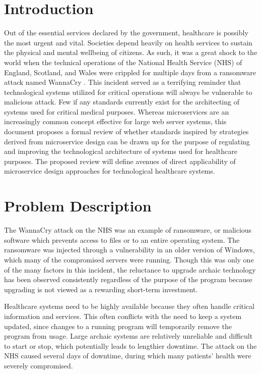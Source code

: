 \documentclass[10pt, oneside, letterpaper]{article}
\begin{document}
	\begin{multicols}{2}

	\section{Introduction}

	Out of the essential services declared by the government, healthcare is possibly the most urgent and vital. Societies depend heavily on health services to sustain the physical and mental wellbeing of citizens. As such, it was a great shock to the world when the technical operations of the National Health Service (NHS) of England, Scotland, and Wales were crippled for multiple days from a ransomware attack named WannaCry \cite{NHS2017}. This incident served as a terrifying reminder that technological systems utilized for critical operations will always be vulnerable to malicious attack. Few if any standards currently exist for the architecting of systems used for critical medical purposes. Whereas microservices are an increasingly common concept effective for large web server systems, this document proposes a formal review of whether standards inspired by strategies derived from microservice design \cite{Thanh2016} can be drawn up for the purpose of regulating and improving the technological architecture of systems used for healthcare purposes. The proposed review will define avenues of direct applicability of microservice design approaches for technological healthcare systems.

	\section{Problem Description}

	The WannaCry attack on the NHS was an example of ransomware, or malicious software which prevents access to files or to an entire operating system. The ransomware was injected through a vulnerability in an older version of Windows, which many of the compromised servers were running. Though this was only one of the many factors in this incident, the reluctance to upgrade archaic technology has been observed consistently regardless of the purpose of the program because upgrading is not viewed as a rewarding short-term investment.

	Healthcare systems need to be highly available because they often handle critical information and services. This often conflicts with the need to keep a system updated, since changes to a running program will temporarily remove the program from usage. Large archaic systems are relatively unreliable and difficult to start or stop, which potentially leads to lengthier downtime. The attack on the NHS caused several days of downtime, during which many patients' health were severely compromised.


\end{multicols}
\end{document}
